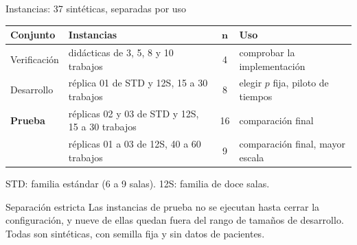 \documentclass[aspectratio=169,11pt]{beamer}
\newcommand{\best}[1]{\textcolor{best}{\textbf{#1}}}
\begin{document}
\begin{frame}{Instancias: 37 sintéticas, separadas por uso}
  \centering
  \footnotesize
  \setlength{\tabcolsep}{5pt}
  \renewcommand{\arraystretch}{1.2}
  \begin{tabular}{@{}llcl@{}}
    \toprule
    \textbf{Conjunto} & \textbf{Instancias} & $\boldsymbol{n}$ & \textbf{Uso} \\
    \midrule
    Verificación & didácticas de 3, 5, 8 y 10 trabajos & 4 & comprobar la implementación \\
    Desarrollo & réplica 01 de STD y 12S, 15 a 30 trabajos & 8 & elegir $p$ fija, piloto de tiempos \\
    \best{Prueba} & réplicas 02 y 03 de STD y 12S, 15 a 30 trabajos & 16 & comparación final \\
    & réplicas 01 a 03 de 12S, 40 a 60 trabajos & 9 & comparación final, mayor escala \\
    \bottomrule
  \end{tabular}

  \vspace{0.1cm}
  {\scriptsize STD: familia estándar (6 a 9 salas). \quad 12S: familia de doce salas.}

  \vspace{0.35cm}
  \begin{alertblock}{Separación estricta}
    \small
    Las instancias de prueba no se ejecutan hasta cerrar la configuración, y nueve de ellas quedan fuera del rango de tamaños de desarrollo. Todas son sintéticas, con semilla fija y sin datos de pacientes.
  \end{alertblock}
\end{frame}
\end{document}
